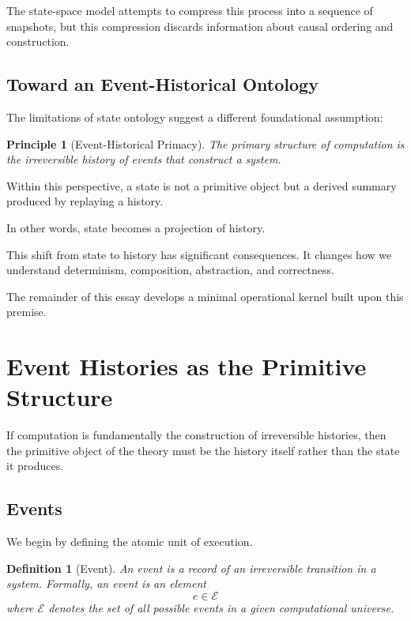 \documentclass[12pt]{article}
\newtheorem{definition}{Definition}
\newtheorem{principle}{Principle}
\begin{document}
The state-space model attempts to compress this process into
a sequence of snapshots, but this compression discards
information about causal ordering and construction.

\subsection{Toward an Event-Historical Ontology}

The limitations of state ontology suggest a different
foundational assumption:

\begin{principle}[Event-Historical Primacy]
The primary structure of computation is the irreversible
history of events that construct a system.
\end{principle}

Within this perspective, a state is not a primitive object
but a derived summary produced by replaying a history.

In other words, state becomes a projection of history.

This shift from state to history has significant consequences.
It changes how we understand determinism, composition,
abstraction, and correctness.

The remainder of this essay develops a minimal operational
kernel built upon this premise.


\section{Event Histories as the Primitive Structure}

If computation is fundamentally the construction of irreversible
histories, then the primitive object of the theory must be
the history itself rather than the state it produces.

\subsection{Events}

We begin by defining the atomic unit of execution.

\begin{definition}[Event]
An \emph{event} is a record of an irreversible transition in a system.
Formally, an event is an element
\[
e \in \mathcal{E}
\]
where $\mathcal{E}$ denotes the set of all possible events
in a given computational universe.
\end{definition}
\end{document}
